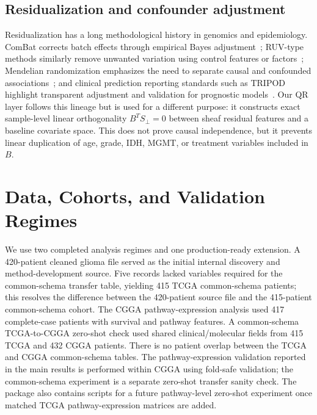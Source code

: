 \documentclass[conference]{IEEEtran}
\begin{document}
\subsection{Residualization and confounder adjustment}
Residualization has a long methodological history in genomics and epidemiology. ComBat corrects batch effects through empirical Bayes adjustment~\cite{johnson2007}; RUV-type methods similarly remove unwanted variation using control features or factors~\cite{gagnonbartsch2012}; Mendelian randomization emphasizes the need to separate causal and confounded associations~\cite{daveysmith2014}; and clinical prediction reporting standards such as TRIPOD highlight transparent adjustment and validation for prognostic models~\cite{collins2015,moons2015}. Our QR layer follows this lineage but is used for a different purpose: it constructs exact sample-level linear orthogonality $B^TS_\perp=0$ between sheaf residual features and a baseline covariate space. This does not prove causal independence, but it prevents linear duplication of age, grade, IDH, MGMT, or treatment variables included in $B$.


\section{Data, Cohorts, and Validation Regimes}
We use two completed analysis regimes and one production-ready extension. A 420-patient cleaned glioma file served as the initial internal discovery and method-development source. Five records lacked variables required for the common-schema transfer table, yielding 415 TCGA common-schema patients; this resolves the difference between the 420-patient source file and the 415-patient common-schema cohort. The CGGA pathway-expression analysis used 417 complete-case patients with survival and pathway features. A common-schema TCGA-to-CGGA zero-shot check used shared clinical/molecular fields from 415 TCGA and 432 CGGA patients. There is no patient overlap between the TCGA and CGGA common-schema tables. The pathway-expression validation reported in the main results is performed within CGGA using fold-safe validation; the common-schema experiment is a separate zero-shot transfer sanity check. The package also contains scripts for a future pathway-level zero-shot experiment once matched TCGA pathway-expression matrices are added.
\end{document}
